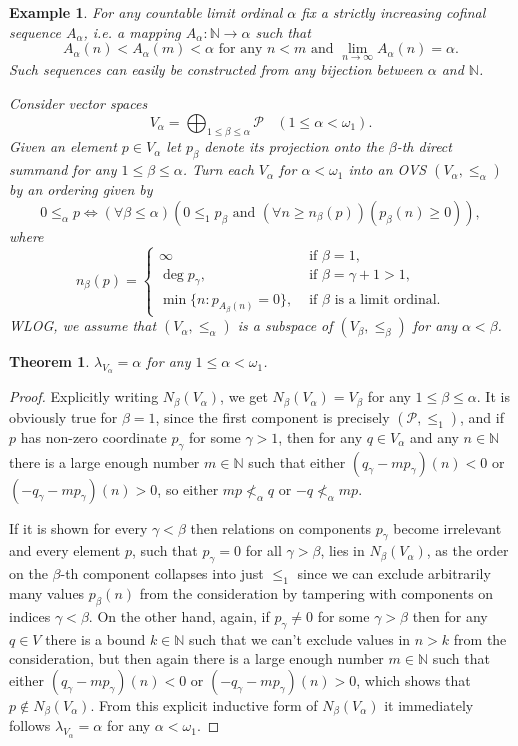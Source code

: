 \documentclass[10pt]{article}
\newtheorem{theorem}{Theorem}[section]
\newtheorem{example}{Example}[section]
\renewcommand{\a}{\alpha}
\renewcommand{\b}{\beta}
\newcommand{\g}{\gamma}
\newcommand{\w}{\omega}
\begin{document}
\begin{example}\label{Example-4_1}
For any countable limit ordinal $ \a $ fix a strictly increasing cofinal sequence $ A_\a $, i.e. a mapping $ A_\a : \mathbb{N} \to \a $ such that
$$
   A_\a(n)<A_\a(m) < \a \text{ for any }  n < m \text{ and } \lim_{n \to \infty} A_\a(n) = \a. 
$$
Such sequences can easily be constructed from any bijection between $\a$ and $\mathbb{N}$.

\smallskip
Consider vector spaces
$$
   V_\a = \bigoplus_{1 \leqslant \b \leqslant \a} \mathcal{P} \ \ \ \ (1 \leqslant \a < \w_1).
$$
Given an element $ p \in V_\a $ let $ p_\b $ denote its projection onto the $ \b $-th direct summand for any $ 1 \leqslant \b \leqslant \a $.
Turn each $ V_\a $ for $ \a < \w_1 $ into an OVS $(V_\a, \leqslant_\a)$ by an ordering given by
$$
	0 \leqslant_\a p \iff
	( \forall \b \leqslant \a )
	( 0 \leqslant_1 p_\b \text{ and } ( \forall n \geqslant n_\b(p) )( p_\b(n) \geqslant 0 ) ),
$$
where
$$
	n_\b(p) =
	\begin{cases}
		\infty  & \text{ if } \b = 1,\\
		\deg p_\g, & \text{ if } \b = \g + 1 > 1,\\
		\min\{n : p_{A_\b(n)} = 0\}, & \text{ if } \b \text{ is a limit ordinal}.
	\end{cases}
$$
WLOG, we assume that $(V_\a, \leqslant_\a)$ is a subspace of $(V_\b, \leqslant_\b) $ for any $ \a < \b $.
\end{example}

\begin{theorem}\label{Theorem-4_1}
$\lambda_{V_\a} = \a $ for any $ 1 \leqslant \alpha < \w_1 $.
\end{theorem}

\begin{proof}
Explicitly writing $ N_\b (V_\a) $,  we get $N_\b(V_\a) = V_\b$ for any $1 \leqslant \b \leqslant \a $.
It is obviously true for $ \b = 1 $, since the first component is precisely $ (\mathcal{P}, \leqslant_1) $, and if $ p $ 
has non-zero coordinate $ p_\g $ for some $ \g > 1 $, then for any $ q \in V_\a $ and any $ n \in \mathbb{N} $ 
there is a large enough number $ m \in \mathbb{N} $ such that either $ (q_\g-mp_\g)(n) < 0 $ or $ (-q_\g-mp_\g)(n) > 0 $, 
so either $ mp \not<_\a q $ or $ -q \not<_\a mp $.

\medskip
If it is shown for every $ \g < \b $ then relations on components $ p_\g $ become irrelevant and every element $ p $, 
such that $ p_\g = 0 $ for all $ \g > \b $, lies in $ N_\b(V_\a) $, as the order on the $ \b $-th component collapses 
into just $ \leqslant_1 $ since we can exclude arbitrarily many values $ p_\beta(n) $ from the consideration 
by tampering with components on indices $ \g < \b $. On the other hand, again, if $ p_\g \neq 0 $ for some $ \g > \b $ 
then for any $ q \in V $ there is a bound $ k \in \mathbb{N} $ such that we can't exclude values in $ n > k $ from the consideration, 
but then again there is a large enough number $ m \in \mathbb{N} $ such that either $ (q_\g-mp_\g)(n) < 0 $ or $ (-q_\g-mp_\g)(n) > 0 $, 
which shows that $ p \notin N_\b(V_\a) $.
From this explicit inductive form of $ N_\b(V_\a) $ it immediately follows $\lambda_{V_\a} = \a $ for any $ \a < \w_1 $.
\end{proof}
\end{document}
